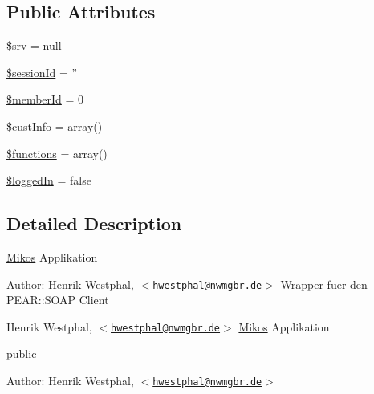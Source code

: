 \subsection*{Public Attributes}
\begin{CompactItemize}
\item 
\hypertarget{class_mikos_b2c161f216ec3c7dbb6f839216498937}{
\hyperlink{class_mikos_b2c161f216ec3c7dbb6f839216498937}{\$srv} = null}
\label{class_mikos_b2c161f216ec3c7dbb6f839216498937}

\item 
\hypertarget{class_mikos_4a34dfb848a11678d24576cf66a2bce0}{
\hyperlink{class_mikos_4a34dfb848a11678d24576cf66a2bce0}{\$sessionId} = ''}
\label{class_mikos_4a34dfb848a11678d24576cf66a2bce0}

\item 
\hypertarget{class_mikos_96178fa3b375bc90c880320b96c2d488}{
\hyperlink{class_mikos_96178fa3b375bc90c880320b96c2d488}{\$memberId} = 0}
\label{class_mikos_96178fa3b375bc90c880320b96c2d488}

\item 
\hypertarget{class_mikos_68c6b39b0ce3997e1775e20fea5bc08f}{
\hyperlink{class_mikos_68c6b39b0ce3997e1775e20fea5bc08f}{\$custInfo} = array()}
\label{class_mikos_68c6b39b0ce3997e1775e20fea5bc08f}

\item 
\hypertarget{class_mikos_2e213b8a1845f268c7adf217dc4fe9e5}{
\hyperlink{class_mikos_2e213b8a1845f268c7adf217dc4fe9e5}{\$functions} = array()}
\label{class_mikos_2e213b8a1845f268c7adf217dc4fe9e5}

\item 
\hypertarget{class_mikos_1909fd7017ff23b5c832c540db814486}{
\hyperlink{class_mikos_1909fd7017ff23b5c832c540db814486}{\$loggedIn} = false}
\label{class_mikos_1909fd7017ff23b5c832c540db814486}

\end{CompactItemize}


\subsection{Detailed Description}
\hyperlink{class_mikos}{Mikos} Applikation

\begin{Desc}
\item[Author:]Henrik Westphal, $<$\href{mailto:hwestphal@nwmgbr.de}{\tt hwestphal@nwmgbr.de}$>$ Wrapper fuer den PEAR::SOAP Client

Henrik Westphal, $<$\href{mailto:hwestphal@nwmgbr.de}{\tt hwestphal@nwmgbr.de}$>$ \hyperlink{class_mikos}{Mikos} Applikation\end{Desc}
public \begin{Desc}
\item[Author:]Henrik Westphal, $<$\href{mailto:hwestphal@nwmgbr.de}{\tt hwestphal@nwmgbr.de}$>$ \end{Desc}


